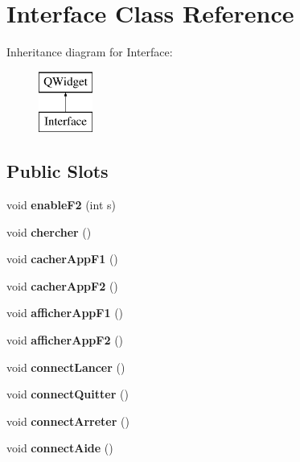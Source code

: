 \hypertarget{class_interface}{}\section{Interface Class Reference}
\label{class_interface}
Inheritance diagram for Interface\+:\begin{figure}[H]
\begin{center}
\leavevmode
\includegraphics[height=2.000000cm]{class_interface}
\end{center}
\end{figure}
\subsection*{Public Slots}
\begin{DoxyCompactItemize}
\item 
\mbox{\label{class_interface_ae3fb6f273993f8207b2418b68936d873}} 
void {\bfseries enable\+F2} (int s)
\item 
\mbox{\label{class_interface_a3b03a85d7a8dce0bffef8d793c0f2195}} 
void {\bfseries chercher} ()
\item 
\mbox{\label{class_interface_a80a1e37847e43306b94bf53496669e3b}} 
void {\bfseries cacher\+App\+F1} ()
\item 
\mbox{\label{class_interface_ae35b4de3ed5d1433ca4950891fd48fab}} 
void {\bfseries cacher\+App\+F2} ()
\item 
\mbox{\label{class_interface_a5f0bd803004e90b825dd4b22ccf66890}} 
void {\bfseries afficher\+App\+F1} ()
\item 
\mbox{\label{class_interface_ad52e9863e8e9f3e496780f67d18f07a7}} 
void {\bfseries afficher\+App\+F2} ()
\item 
\mbox{\label{class_interface_a0e2f245c0c3c924503a70bd9325e746d}} 
void {\bfseries connect\+Lancer} ()
\item 
\mbox{\label{class_interface_a303469419b33103af1a14589ad02f2ef}} 
void {\bfseries connect\+Quitter} ()
\item 
\mbox{\label{class_interface_adeffb11a443b9996cdf5fd20fdab2aa7}} 
void {\bfseries connect\+Arreter} ()
\item 
\mbox{\label{class_interface_a9633135a56d6c960b17702c9021dfc6c}} 
void {\bfseries connect\+Aide} ()
\end{DoxyCompactItemize}
